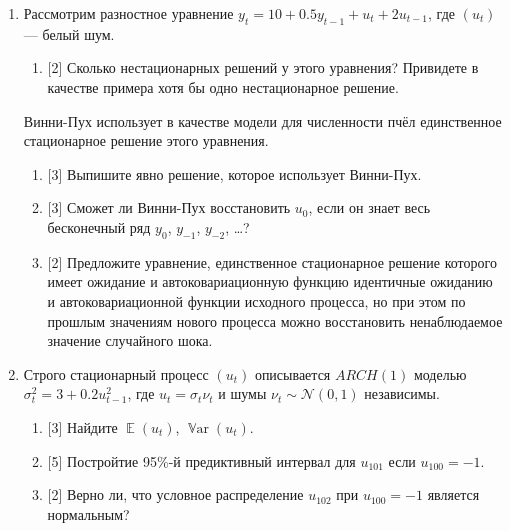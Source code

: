 \documentclass[12pt]{article}
\DeclareMathOperator{\Var}{\mathbb{V}ar}
\DeclareMathOperator{\E}{\mathbb{E}}
\newcommand{\cN}{\mathcal{N}}
\begin{document}
\begin{enumerate}
    \newpage

    \item Рассмотрим разностное уравнение $y_t = 10 + 0.5 y_{t-1} + u_{t} + 2 u_{t-1}$, где $(u_t)$ — белый шум. 
    \begin{enumerate}
        \item {[2]} Сколько нестационарных решений у этого уравнения? Привидете в качестве примера хотя бы одно нестационарное решение. 
    \end{enumerate}
    Винни-Пух использует в качестве модели для численности пчёл единственное стационарное решение этого уравнения. 
    \begin{enumerate}[resume]
        \item {[3]} Выпишите явно решение, которое использует Винни-Пух. 
        \item {[3]} Сможет ли Винни-Пух восстановить $u_0$, если он знает весь бесконечный ряд $y_0$, $y_{-1}$, $y_{-2}$, \dots?
        \item {[2]} Предложите уравнение, единственное стационарное решение которого имеет ожидание и автоковариационную функцию идентичные ожиданию и автоковариационной функции исходного процесса,
        но при этом по прошлым значениям нового процесса можно восстановить ненаблюдаемое значение случайного шока. 
    \end{enumerate}

    \item   Строго стационарный процесс $(u_t)$ описывается $ARCH(1)$ моделью $\sigma^2_t = 3 + 0.2 u_{t-1}^2$, где 
    $u_t = \sigma_t \nu_t$ и шумы $\nu_t \sim \cN(0, 1)$ независимы.
    \begin{enumerate}
        \item {[3]} Найдите $\E(u_t)$, $\Var(u_t)$.
        \item {[5]} Постройтие 95\%-й предиктивный интервал для $u_{101}$ если $u_{100} = -1$.
        \item {[2]} Верно ли, что условное распределение $u_{102}$ при $u_{100} = -1$ является нормальным?
    \end{enumerate}


\end{enumerate}
\end{document}
